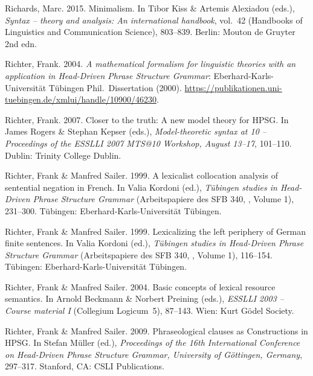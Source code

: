 \begin{thebibliography}{1420}
Richards, Marc. 2015.
\newblock Minimalism.
\newblock In Tibor Kiss \& Artemis Alexiadou (eds.), \emph{Syntax -- theory and
  analysis: {An} international handbook}, vol.~42  (Handbooks of Linguistics
  and Communication Science), 803--839. Berlin: Mouton de Gruyter 2nd edn.

Richter, Frank. 2004.
\newblock \emph{A mathematical formalism for linguistic theories with an
  application in {Head-Driven Phrase Structure Grammar}}:
  Eberhard-Karls-Universit{\"a}t T{\"u}bingen {Phil.\ Dissertation (2000)}.
\newblock
  \urlprefix\url{https://publikationen.uni-tuebingen.de/xmlui/handle/10900/46230}.

Richter, Frank. 2007.
\newblock Closer to the truth: {A} new model theory for {HPSG}.
\newblock In James Rogers \& Stephan Kepser (eds.), \emph{Model-theoretic
  syntax at 10 -- {Proceedings} of the {ESSLLI 2007 MTS@10 Workshop, August
  13--17}}, 101--110. Dublin: Trinity College Dublin.

Richter, Frank \& Manfred Sailer. 1999{}.
\newblock A lexicalist collocation analysis of sentential negation in {French}.
\newblock In Valia Kordoni (ed.), \emph{T{\"u}bingen studies in {Head-Driven
  Phrase Structure Grammar}}  ({Arbeitspapiere des SFB 340, , Volume
  1}), 231--300. T\"u\-bing\-en: Eberhard-Karls-Universit{\"a}t T{\"u}bingen.

Richter, Frank \& Manfred Sailer. 1999{}.
\newblock Lexicalizing the left periphery of {German} finite sentences.
\newblock In Valia Kordoni (ed.), \emph{T{\"u}bingen studies in {Head-Driven
  Phrase Structure Grammar}}  ({Arbeitspapiere des SFB 340, , Volume
  1}), 116--154. T\"u\-bing\-en: Eberhard-Karls-Universit{\"a}t T{\"u}bingen.

Richter, Frank \& Manfred Sailer. 2004.
\newblock Basic concepts of lexical resource semantics.
\newblock In Arnold Beckmann \& Norbert Preining (eds.), \emph{{ESSLLI} 2003 --
  {Course} material {I}} (Collegium Logicum~5), 87--143. Wien: Kurt G{\"o}del
  Society.

Richter, Frank \& Manfred Sailer. 2009.
\newblock Phraseological clauses as {Constructions} in {HPSG}.
\newblock In Stefan M{\"u}ller (ed.), \emph{Proceedings of the {16th
  International Conference on Head-Driven Phrase Structure Grammar, University
  of G{\"o}ttingen, Germany}}, 297--317. Stanford, CA: CSLI Publications.


\end{thebibliography}
